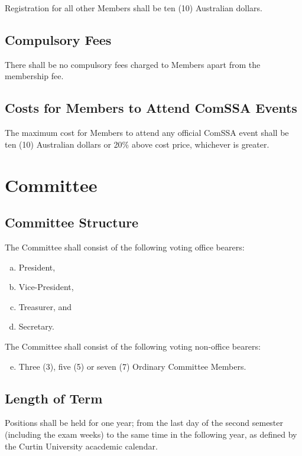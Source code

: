 \documentclass[a4paper,12pt]{article}
\begin{document}
Registration for all other Members shall be ten (10) Australian dollars.

\subsection{Compulsory Fees}

There shall be no compulsory fees charged to Members apart from the membership fee.

\subsection{Costs for Members to Attend ComSSA Events}

The maximum cost for Members to attend any official ComSSA event shall be ten (10) Australian dollars or 20\% above cost price, whichever is greater.

\section{Committee}

\subsection{Committee Structure}

The Committee shall consist of the following voting office bearers:

\begin{enumerate}[a)]
	\item President,
	\item Vice-President,
	\item Treasurer, and
	\item Secretary.
\end{enumerate}

The Committee shall consist of the following voting non-office bearers:

\begin{enumerate}[a)]
	\setcounter{enumi}{4}
	\item Three (3), five (5) or seven (7) Ordinary Committee Members.
\end{enumerate}

\subsection{Length of Term}

Positions shall be held for one year; from the last day of the second semester (including the exam weeks) to the same time in the following year, as defined by the Curtin University acacdemic calendar.
\end{document}
